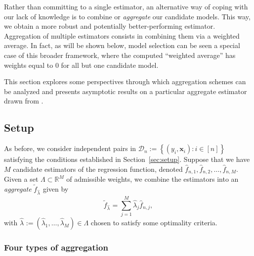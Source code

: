 \documentclass[11pt, letter paper]{article}
\newcommand{\1}{\mathmybb{1}}
\newcommand{\R}{\mathbb{R}}
\newcommand{\0}{\emptyset}
\newcommand{\paren}[1]{\left(#1 \right)}
\newcommand{\set}[1]{\left\{ #1 \right\}}
\newcommand{\data}{\mathcal{D}_{n}}
\newcommand{\x}{\boldsymbol{x}}
\newcommand{\fhat}[2]{\hat{f}_{#1, #2}}
\newcommand{\ftilde}[1]{\tilde{f}_{#1}}
\newcommand{\lambdahat}[1]{\hat{\lambda}_{#1}}
\begin{document}
Rather than committing to a single estimator, an alternative way of coping with our lack of knowledge is to combine or \emph{aggregate} our candidate models. This way, we obtain a more robust and potentially better-performing estimator. Aggregation of multiple estimators consists in combining them via a weighted average. In fact, as will be shown below, model selection can be seen a special case of this broader framework, where the computed ``weighted average'' has weights equal to 0 for all but one candidate model. 

This section explores some perspectives through which aggregation schemes can be analyzed and presents asymptotic results on a particular aggregate estimator drawn from \textcite{bunea_2007}.

\subsection{Setup}

As before, we consider independent pairs in \(\data := \set{\paren{y_{i}, \x_{i}}:i\in [n]}\) satisfying the conditions established in Section~\ref{sec:setup}. Suppose that we have \(M\) candidate estimators of the regression function, denoted \(\fhat{n}{1}, \fhat{n}{2}, \ldots, \fhat{n}{M}\). Given a set \(\Lambda\subset\R^{M}\) of admissible weights, we combine the estimators into an \emph{aggregate} \(\ftilde{\lambdahat{}}\) given by
\[\ftilde{\lambdahat{}} = \sum_{j=1}^{M}\lambdahat{j} \fhat{n}{j},\]
with \(\lambdahat{}:=\paren{\lambdahat{1}, \ldots, \lambdahat{M}}\in \Lambda\) chosen to satisfy some optimality criteria.

\subsubsection{Four types of aggregation}\label{sec:buneaschemes}
\end{document}
